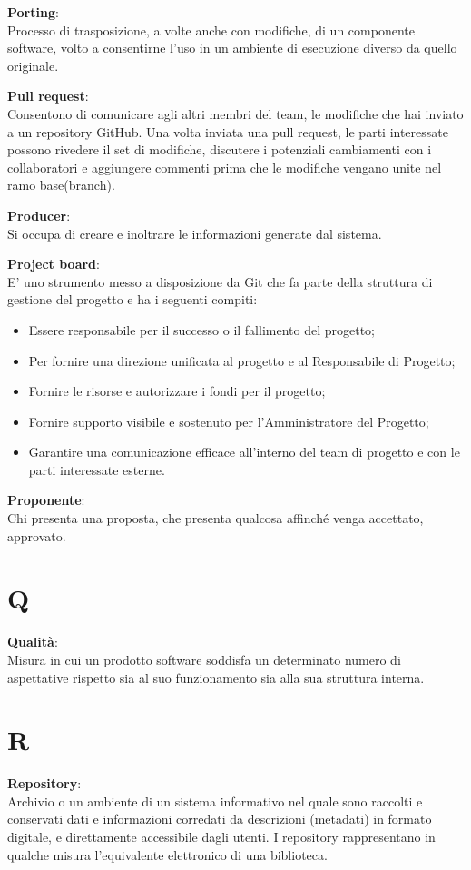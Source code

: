\documentclass[a4paper, oneside, openany, dvipsnames, table]{article}
\begin{document}
\textbf{Porting}:\\	Processo di trasposizione, a volte anche con modifiche, di un componente software, volto a consentirne l'uso in un ambiente di esecuzione diverso da quello originale.

\textbf{Pull request}:\\	Consentono di comunicare agli altri membri del team, le modifiche che hai inviato a un repository GitHub. Una volta inviata una pull request, le parti interessate possono rivedere il set di modifiche, discutere i potenziali cambiamenti con i collaboratori e aggiungere commenti prima che le modifiche vengano unite nel ramo base(branch).

\textbf{Producer}:\\	Si occupa di creare e inoltrare le informazioni generate dal sistema.

\textbf{Project board}:\\	E' uno strumento messo a disposizione da Git che fa parte della struttura di gestione del progetto e ha i seguenti compiti:
\begin{itemize}
\item Essere responsabile per il successo o il fallimento del progetto;
\item Per fornire una direzione unificata al progetto e al Responsabile di Progetto;
\item Fornire le risorse e autorizzare i fondi per il progetto;
\item Fornire supporto visibile e sostenuto per l'Amministratore del Progetto;
\item Garantire una comunicazione efficace all'interno del team di progetto e con le parti interessate esterne.
\end{itemize}
\textbf{Proponente}:\\	Chi presenta una proposta, che presenta qualcosa affinché venga accettato, approvato.


\newpage
\section{Q}
\textbf{Qualità}:\\	Misura in cui un prodotto software soddisfa un determinato numero di aspettative rispetto sia al suo funzionamento sia alla sua struttura interna.


\newpage
\section{R}
\textbf{Repository}:\\	Archivio o un ambiente di un sistema informativo nel quale sono raccolti e conservati dati e informazioni corredati da descrizioni (metadati) in formato digitale, e direttamente accessibile dagli utenti. I repository rappresentano in qualche misura l’equivalente elettronico di una biblioteca.
\end{document}
